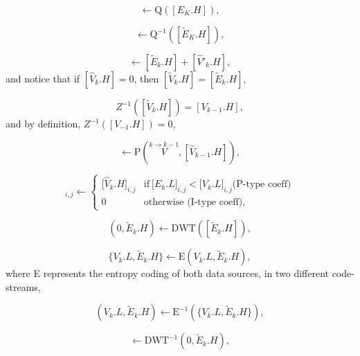 \begin{equation}
  [\tilde{E}_k.H] \leftarrow \text{Q}([E_K.H]),
  \tag{d}
\end{equation}

\begin{equation}
  [\tilde{E}_k.H] \leftarrow  \text{Q}^{-1}([\tilde{E}_K.H]),
  \tag{E.g}
\end{equation}

\begin{equation}
  [\tilde{V}_k.H] \leftarrow [\tilde{E}_k.H] + [\hat{V}'_k.H],
  \tag{E.h}
\end{equation}
and notice that if $[\hat{V}_k.H]=0$, then $[\tilde{V}_k.H] =
[\tilde{E}_k.H]$,

\begin{equation}
  Z^{-1}([\tilde{V}_k.H]) = [V_{k-1}.H],
  \tag{E.i}
\end{equation}
and by definition, $Z^{-1}([V_{-1}.H]) = 0$,

\begin{equation}
  [\hat{V}_k.H] \leftarrow \text{P}(\overset{k\rightarrow k-1}{V}, [\overset{\sim}{V}_{k-1}.H]),
  \tag{E.j}
\end{equation}

\begin{equation}
  [\hat{V}'_k.H]_{i,j} \leftarrow \left\{
    \begin{array}{ll}
      {[}\hat{V}_k.H{]}_{i,j}  & \text{if}~{[}E_k.L{]}_{i,j} < {[}V_k.L{]}_{i,j} \text{(P-type coeff)} \\
      0                       & \text{otherwise (I-type coeff)},
    \end{array}
  \right.
  \tag{E.k}
\end{equation}
  
\begin{equation}
  (0, \tilde{E}_k.H) \leftarrow \text{DWT}([\tilde{E}_k.H]),
  \tag{f}
\end{equation}

\begin{equation}
  \{V_k.L, \tilde{E}_k.H\} \leftarrow \text{E}(V_k.L, \tilde{E}_k.H),
  \tag{g}
\end{equation}
where E represents the entropy coding of both data sources, in two
different code-streams,

\begin{equation}
  (V_k.L, \tilde{E}_k.H) \leftarrow \text{E}^{-1}(\{V_k.L, \tilde{E}_k.H\}),
  \tag{h}
\end{equation}

\begin{equation}
  [\tilde{E}_k.H] \leftarrow \text{DWT}^{-1}(0, \tilde{E}_k.H),
  \tag{i}
\end{equation}

